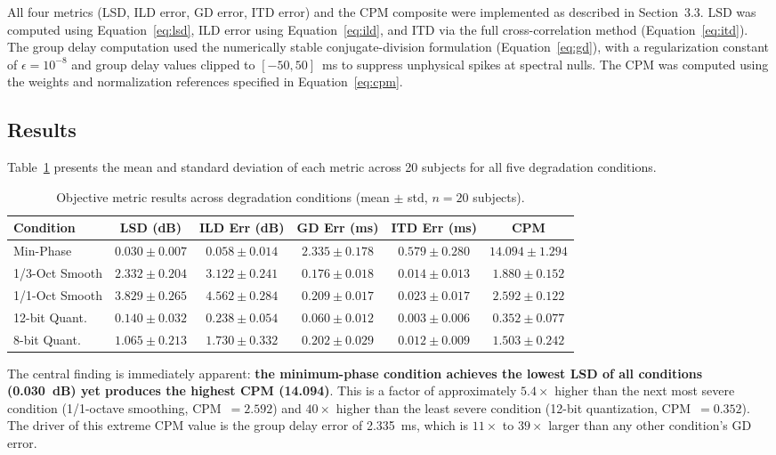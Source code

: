 \documentclass[12pt,a4paper]{article}
\begin{document}
All four metrics (LSD, ILD error, GD error, ITD error) and the CPM composite were implemented as described in Section~3.3. LSD was computed using Equation~\ref{eq:lsd}, ILD error using Equation~\ref{eq:ild}, and ITD via the full cross-correlation method (Equation~\ref{eq:itd}). The group delay computation used the numerically stable conjugate-division formulation (Equation~\ref{eq:gd}), with a regularization constant of $\epsilon = 10^{-8}$ and group delay values clipped to $[-50, 50]$~ms to suppress unphysical spikes at spectral nulls. The CPM was computed using the weights and normalization references specified in Equation~\ref{eq:cpm}.

\subsection{Results}

Table~\ref{tab:results} presents the mean and standard deviation of each metric across 20 subjects for all five degradation conditions.

\begin{table}[htbp]
\centering
\caption{Objective metric results across degradation conditions (mean $\pm$ std, $n = 20$ subjects).}
\label{tab:results}
\begin{tabular}{lccccc}
\toprule
\textbf{Condition} & \textbf{LSD (dB)} & \textbf{ILD Err (dB)} & \textbf{GD Err (ms)} & \textbf{ITD Err (ms)} & \textbf{CPM} \\
\midrule
Min-Phase        & $0.030 \pm 0.007$ & $0.058 \pm 0.014$ & $2.335 \pm 0.178$ & $0.579 \pm 0.280$ & $\mathbf{14.094 \pm 1.294}$ \\
1/3-Oct Smooth   & $2.332 \pm 0.204$ & $3.122 \pm 0.241$ & $0.176 \pm 0.018$ & $0.014 \pm 0.013$ & $1.880 \pm 0.152$ \\
1/1-Oct Smooth   & $3.829 \pm 0.265$ & $4.562 \pm 0.284$ & $0.209 \pm 0.017$ & $0.023 \pm 0.017$ & $2.592 \pm 0.122$ \\
12-bit Quant.    & $0.140 \pm 0.032$ & $0.238 \pm 0.054$ & $0.060 \pm 0.012$ & $0.003 \pm 0.006$ & $0.352 \pm 0.077$ \\
8-bit Quant.     & $1.065 \pm 0.213$ & $1.730 \pm 0.332$ & $0.202 \pm 0.029$ & $0.012 \pm 0.009$ & $1.503 \pm 0.242$ \\
\bottomrule
\end{tabular}
\end{table}

The central finding is immediately apparent: \textbf{the minimum-phase condition achieves the lowest LSD of all conditions (0.030~dB) yet produces the highest CPM (14.094)}. This is a factor of approximately $5.4\times$ higher than the next most severe condition (1/1-octave smoothing, CPM~$= 2.592$) and $40\times$ higher than the least severe condition (12-bit quantization, CPM~$= 0.352$). The driver of this extreme CPM value is the group delay error of 2.335~ms, which is $11\times$ to $39\times$ larger than any other condition's GD error.
\end{document}
